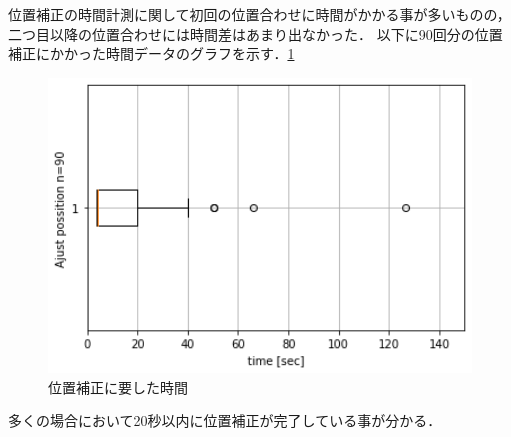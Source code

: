 位置補正の時間計測に関して初回の位置合わせに時間がかかる事が多いものの，二つ目以降の位置合わせには時間差はあまり出なかった．
以下に90回分の位置補正にかかった時間データのグラフを示す．\ref{postime_plot}

\begin{figure}[htbp]
    \begin{center}
      \includegraphics[clip,width=15.0cm]{img/timedata.png}
      \caption{位置補正に要した時間}
      \label{postime_plot}
    \end{center}
  \end{figure}

  多くの場合において20秒以内に位置補正が完了している事が分かる．